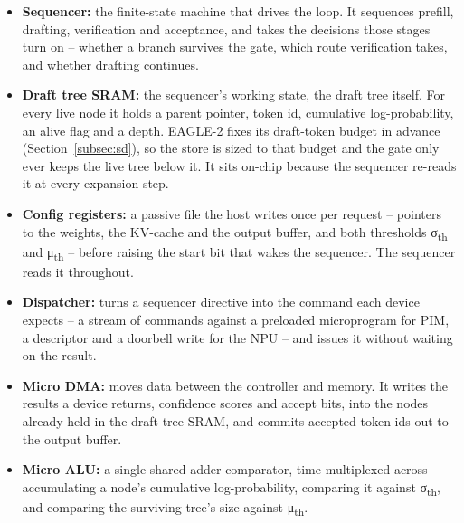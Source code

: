 \documentclass[11pt]{article}
\begin{document}
\begin{itemize}
    \item \textbf{Sequencer:} the finite-state machine that drives the loop. It sequences prefill, drafting, verification and acceptance, and takes the decisions those stages turn on -- whether a branch survives the gate, which route verification takes, and whether drafting continues.
    \item \textbf{Draft tree SRAM:} the sequencer's working state, the draft tree itself. For every live node it holds a parent pointer, token id, cumulative log-probability, an alive flag and a depth. EAGLE-2 fixes its draft-token budget in advance (Section~\ref{subsec:sd}), so the store is sized to that budget and the gate only ever keeps the live tree below it. It sits on-chip because the sequencer re-reads it at every expansion step.
    \item \textbf{Config registers:} a passive file the host writes once per request -- pointers to the weights, the KV-cache and the output buffer, and both thresholds σ\textsubscript{th} and μ\textsubscript{th} -- before raising the start bit that wakes the sequencer. The sequencer reads it throughout.
    \item \textbf{Dispatcher:} turns a sequencer directive into the command each device expects -- a stream of commands against a preloaded microprogram for PIM, a descriptor and a doorbell write for the NPU -- and issues it without waiting on the result.
    \item \textbf{Micro DMA:} moves data between the controller and memory. It writes the results a device returns, confidence scores and accept bits, into the nodes already held in the draft tree SRAM, and commits accepted token ids out to the output buffer.
    \item \textbf{Micro ALU:} a single shared adder-comparator, time-multiplexed across accumulating a node's cumulative log-probability, comparing it against σ\textsubscript{th}, and comparing the surviving tree's size against μ\textsubscript{th}.
\end{itemize}
\end{document}
